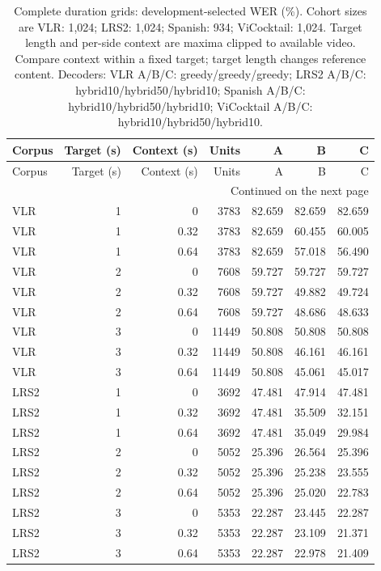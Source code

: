 \begingroup
\footnotesize
\setlength{\tabcolsep}{3pt}
\begin{longtable}{lrrrrrr}
\caption{Complete duration grids: development-selected WER (\%). Cohort sizes are VLR: 1,024; LRS2: 1,024; Spanish: 934; ViCocktail: 1,024. Target length and per-side context are maxima clipped to available video. Compare context within a fixed target; target length changes reference content. Decoders: VLR A/B/C: greedy/greedy/greedy; LRS2 A/B/C: hybrid10/hybrid50/hybrid10; Spanish A/B/C: hybrid10/hybrid50/hybrid10; ViCocktail A/B/C: hybrid10/hybrid50/hybrid10.}\label{tab:duration-grid}\\
\toprule
Corpus & Target (s) & Context (s) & Units & A & B & C \\
\midrule
\endfirsthead
\toprule
Corpus & Target (s) & Context (s) & Units & A & B & C \\
\midrule
\endhead
\midrule
\multicolumn{7}{r}{Continued on the next page}\\
\endfoot
\bottomrule
\endlastfoot
VLR & 1 & 0 & 3783 & 82.659 & 82.659 & 82.659 \\
VLR & 1 & 0.32 & 3783 & 82.659 & 60.455 & 60.005 \\
VLR & 1 & 0.64 & 3783 & 82.659 & 57.018 & 56.490 \\
VLR & 2 & 0 & 7608 & 59.727 & 59.727 & 59.727 \\
VLR & 2 & 0.32 & 7608 & 59.727 & 49.882 & 49.724 \\
VLR & 2 & 0.64 & 7608 & 59.727 & 48.686 & 48.633 \\
VLR & 3 & 0 & 11449 & 50.808 & 50.808 & 50.808 \\
VLR & 3 & 0.32 & 11449 & 50.808 & 46.161 & 46.161 \\
VLR & 3 & 0.64 & 11449 & 50.808 & 45.061 & 45.017 \\
LRS2 & 1 & 0 & 3692 & 47.481 & 47.914 & 47.481 \\
LRS2 & 1 & 0.32 & 3692 & 47.481 & 35.509 & 32.151 \\
LRS2 & 1 & 0.64 & 3692 & 47.481 & 35.049 & 29.984 \\
LRS2 & 2 & 0 & 5052 & 25.396 & 26.564 & 25.396 \\
LRS2 & 2 & 0.32 & 5052 & 25.396 & 25.238 & 23.555 \\
LRS2 & 2 & 0.64 & 5052 & 25.396 & 25.020 & 22.783 \\
LRS2 & 3 & 0 & 5353 & 22.287 & 23.445 & 22.287 \\
LRS2 & 3 & 0.32 & 5353 & 22.287 & 23.109 & 21.371 \\
LRS2 & 3 & 0.64 & 5353 & 22.287 & 22.978 & 21.409 \\

\end{longtable}
